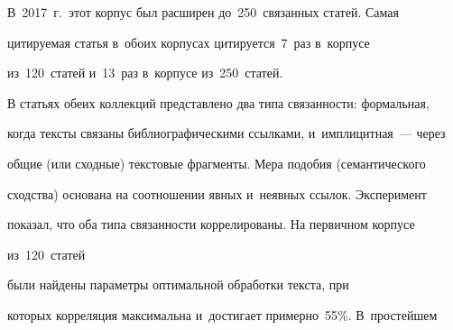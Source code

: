 В~2017~г.\ этот корпус был расширен до~250~связанных статей. Самая 


цитируемая статья в~обоих корпусах цитируется~7~раз в~корпусе 


из~120~статей и~13~раз в~корпусе из~250~статей.


  


  В статьях обеих коллекций представлено два типа связанности: формальная, 


когда тексты связаны библиографическими ссылками, и~имплицитная~--- через\linebreak\vspace*{-12pt}







  


  \noindent


  общие (или сходные) текстовые фрагменты. Мера подобия (семантического 


сходства) основана на соотношении явных и~неявных ссылок. Эксперимент 


показал, что оба типа связанности коррелированы. На первичном корпусе 


из~120~статей


 были найдены параметры оптимальной обработки текста, при 


которых корреляция максимальна и~достигает примерно~55\%. В~простейшем 


